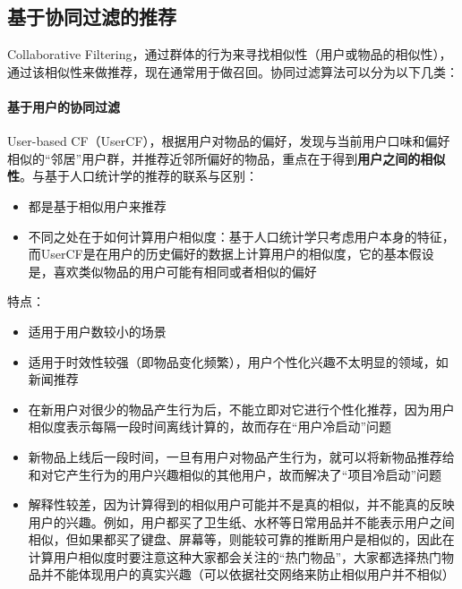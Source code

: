 \subsection{基于协同过滤的推荐}
Collaborative Filtering，通过群体的行为来寻找相似性（用户或物品的相似性），通过该相似性来做推荐，现在通常用于做召回。协同过滤算法可以分为以下几类：
\paragraph{基于用户的协同过滤}
User-based CF（UserCF），根据用户对物品的偏好，发现与当前用户口味和偏好相似的“邻居”用户群，并推荐近邻所偏好的物品，重点在于得到\textbf{用户之间的相似性}。与基于人口统计学的推荐的联系与区别：
\begin{itemize}
	\item 都是基于相似用户来推荐
	\item 不同之处在于如何计算用户相似度：基于人口统计学只考虑用户本身的特征，而UserCF是在用户的历史偏好的数据上计算用户的相似度，它的基本假设是，喜欢类似物品的用户可能有相同或者相似的偏好
\end{itemize}
特点：
\begin{itemize}
	\item 适用于用户数较小的场景
	\item 适用于时效性较强（即物品变化频繁），用户个性化兴趣不太明显的领域，如新闻推荐
	\item 在新用户对很少的物品产生行为后，不能立即对它进行个性化推荐，因为用户相似度表示每隔一段时间离线计算的，故而存在“用户冷启动”问题	
	\item 新物品上线后一段时间，一旦有用户对物品产生行为，就可以将新物品推荐给和对它产生行为的用户兴趣相似的其他用户，故而解决了“项目冷启动”问题
	\item 解释性较差，因为计算得到的相似用户可能并不是真的相似，并不能真的反映用户的兴趣。例如，用户都买了卫生纸、水杯等日常用品并不能表示用户之间相似，但如果都买了键盘、屏幕等，则能较可靠的推断用户是相似的，因此在计算用户相似度时要注意这种大家都会关注的“热门物品”，大家都选择热门物品并不能体现用户的真实兴趣（可以依据社交网络来防止相似用户并不相似）
\end{itemize}

